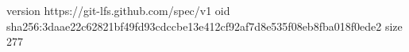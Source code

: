 version https://git-lfs.github.com/spec/v1
oid sha256:3daae22c62821bf49fd93cdccbe13e412cf92af7d8e535f08eb8fba018f0ede2
size 277
